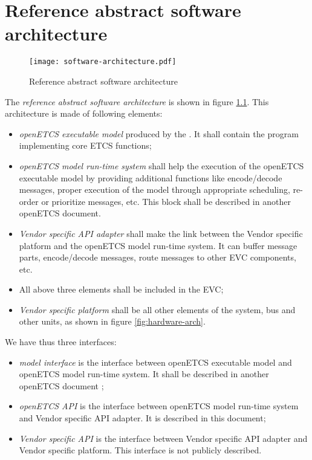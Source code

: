 \chapter{Reference abstract software architecture}
\label{software-arch}

\begin{figure}[htbp]
  \centering
  \texttt{[image: software-architecture.pdf]}
  \caption{Reference abstract software architecture}
  \label{fig:software-arch}
\end{figure}

The \emph{reference abstract software architecture} is shown in figure
\ref{fig:software-arch}. This architecture is made of following
elements:
\begin{itemize}
\item \emph{openETCS executable model} produced by the
  \cite{scade-model}. It shall contain the program implementing core
  ETCS functions;
\item \emph{openETCS model run-time system} shall help the execution
  of the openETCS executable model by providing additional functions
  like encode/decode messages, proper execution of the model through
  appropriate scheduling, re-order or prioritize messages, etc. This
  block shall be described in another openETCS document. 
\item \emph{Vendor specific API adapter} shall make the link between
  the Vendor specific platform and the openETCS model run-time system.
  It can buffer message parts, encode/decode messages, route messages
  to other EVC components, etc.
\item All above three elements shall be included in the EVC;
\item \emph{Vendor specific platform} shall be all other elements of
  the system, bus and other units, as shown in figure
  \ref{fig:hardware-arch}.
\end{itemize}

We have thus three interfaces:
\begin{itemize}
\item \emph{model interface} is the interface between openETCS
  executable model and openETCS model run-time system. It shall be
  described in another openETCS document ;
\item \emph{openETCS API} is the interface between openETCS model
  run-time system and Vendor specific API adapter. It is described in
  this document;
\item \emph{Vendor specific API} is the interface between Vendor
  specific API adapter and Vendor specific platform. This interface is
  not publicly described.
\end{itemize}

